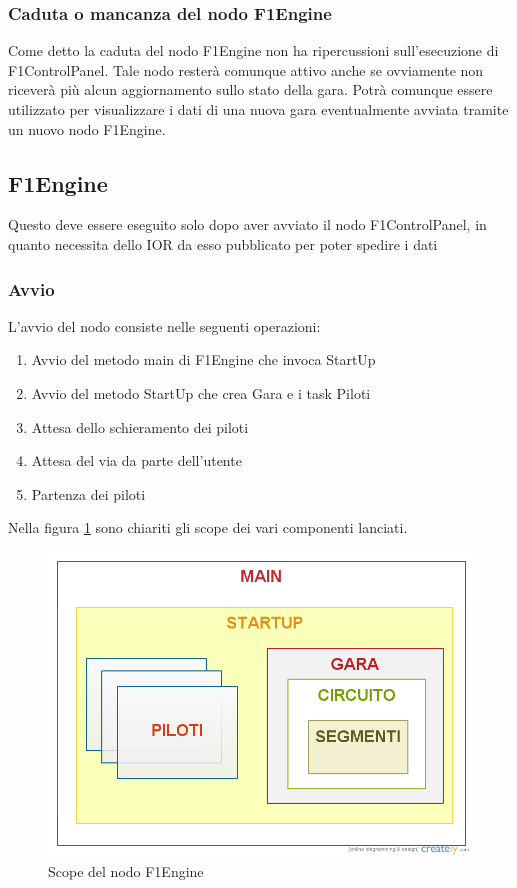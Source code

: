 \documentclass[a4paper,11pt, twoside]{book}
\begin{document}
	\subsubsection{Caduta o mancanza del nodo F1Engine}
	  Come detto la caduta del nodo F1Engine non ha ripercussioni sull'esecuzione di F1ControlPanel. Tale nodo
	  resterà comunque attivo anche se ovviamente non riceverà più alcun aggiornamento sullo stato della gara.
	  Potrà comunque essere utilizzato per visualizzare i dati di una nuova gara eventualmente avviata tramite un nuovo nodo
	  F1Engine.

      \subsection{F1Engine}
        Questo deve essere eseguito solo dopo aver avviato il nodo F1ControlPanel, in quanto necessita
	dello IOR da esso pubblicato per poter spedire i dati
	
	\subsubsection{Avvio}
	  L'avvio del nodo consiste nelle seguenti operazioni:
	  
	  \begin{enumerate}
	    \item Avvio del metodo main di F1Engine che invoca StartUp
	    \item Avvio del metodo StartUp che crea Gara e i task Piloti
	    \item Attesa dello schieramento dei piloti
	    \item Attesa del via da parte dell'utente
	    \item Partenza dei piloti
	  \end{enumerate}
	  
	  Nella figura \ref{Fig:Scope} sono chiariti gli scope dei vari componenti lanciati.
	  
	  \begin{figure}[ht]
	    \centering
	    \includegraphics[width=120mm]{./Immagini/Scope.png}
	    \caption{Scope del nodo F1Engine}
	    \label{Fig:Scope}
	  \end{figure}
  
\end{document}
